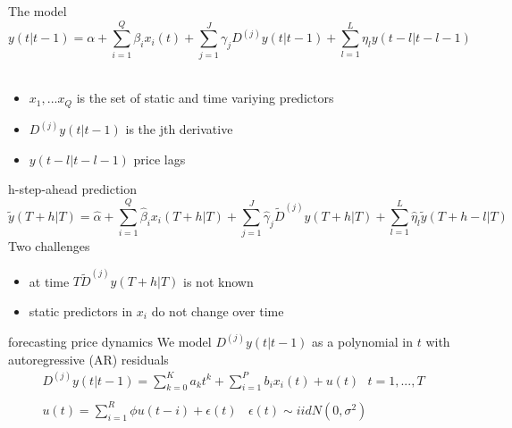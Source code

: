 \documentclass[hyperref={pdfpagelabels=false}]{beamer}
\begin{document}
\begin{frame}{The model} %
\begin{equation}
y(t|t-1)=\alpha+\sum_{i=1}^{Q}\beta_ix_i(t)+\sum_{j=1}^J\gamma_jD^{(j)}y(t|t-1)+\sum_{l=1}^L\eta_ly(t-l|t-l-1) \nonumber
\end{equation}
\newline \\
\begin{itemize}
    \item $x_1,...x_Q$ is the set of static and time variying predictors
    \item $D^{(j)}y(t|t-1)$ is the jth derivative
    \item $y(t-l|t-l-1)$ price lags
\end{itemize}
\end{frame}

\begin{frame}{h-step-ahead prediction}
\small
\begin{equation}
\tilde{y}(T+h|T)=\hat{\alpha}+\sum_{i=1}^{Q}\hat{\beta}_ix_i(T+h|T)+\sum_{j=1}^J\hat{\gamma}_j\tilde{D}^{(j)}y(T+h|T)+\sum_{l=1}^L\hat{\eta}_l\tilde{y}(T+h-l|T) \nonumber
\end{equation}
\normalsize
\newline
Two challenges
\begin{itemize}
    \item at time $T \tilde{D}^{(j)}y(T+h|T)$ is not known
    \item static predictors in $x_i$ do not change over time
\end{itemize}
\end{frame}

\begin{frame}{forecasting price dynamics} %
We model $D^{(j)}y(t|t-1)$ as a polynomial in $t$ with autoregressive (AR) residuals
\begin{align}
D^{(j)}y(t|t-1) =\sum_{k=0}^Ka_kt^k+\sum_{i=1}^Pb_ix_i(t)+u(t) \ \ \ t=1,...,T \nonumber \\ \nonumber \\ u(t)=\sum_{i=1}^R\phi u(t-i)+\epsilon(t) \ \ \ \ \epsilon(t) \sim iidN(0,\sigma^2) \nonumber
\end{align} 
\end{frame}
\end{document}
